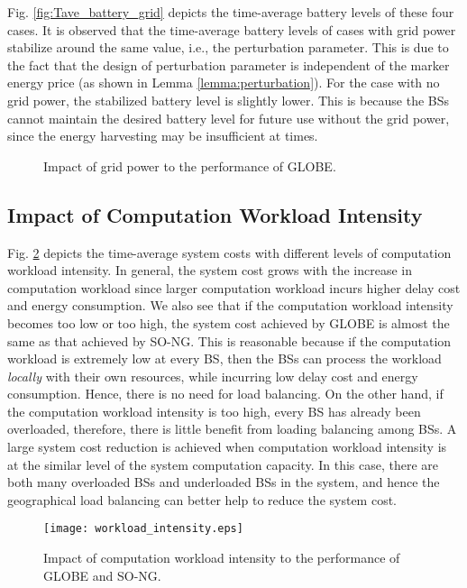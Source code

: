 \documentclass[12pt, draftclsnofoot, letterpaper, onecolumn]{IEEEtran}
\begin{document}
{Fig. \ref{fig:Tave_battery_grid} depicts the time-average battery levels of these four cases. It is observed that the time-average battery levels of cases with grid power stabilize around the same value, i.e., the perturbation parameter. This is due to the fact that the design of perturbation parameter is independent of the marker energy price (as shown in Lemma \ref{lemma:perturbation}). For the case with no grid power, the stabilized battery level is slightly lower. This is because the BSs cannot maintain the desired battery level for future use without the grid power, since the energy harvesting may be insufficient at times.

\begin{figure}[h]
	\centering	
	\caption{Impact of grid power to the performance of GLOBE.}
	\label{fig:grid_power}
\vspace{-20pt}
\end{figure}


\subsection{Impact of Computation Workload Intensity}
Fig. \ref{fig:workload_intensity} depicts the time-average system costs with different levels of computation workload intensity. In general, the system cost grows with the increase in computation workload since larger computation workload incurs higher delay cost and energy consumption. We also see that if the computation workload intensity becomes too low or too high, the system cost achieved by GLOBE is almost the same as that achieved by SO-NG. This is reasonable because if the computation workload is extremely low at every BS, then the BSs can process the workload \emph{locally} with their own resources, while incurring  low delay cost and energy consumption. Hence, there is no need for load balancing. On the other hand, if the computation workload intensity is too high, every BS has already been overloaded, therefore, there is little benefit from loading balancing among BSs. A large system cost reduction is achieved when computation workload intensity is at the similar level of the system computation capacity. In this case, there are both many overloaded BSs and underloaded BSs in the system, and hence the geographical load balancing can better help to reduce the system cost.
\begin{figure}[h]
	\centering	
	\texttt{[image: workload\_intensity.eps]}
\vspace{-10pt}
	\caption{Impact of computation workload intensity to the performance of GLOBE and SO-NG.}
	\label{fig:workload_intensity}
\vspace{-20pt}
\end{figure}

}
\end{document}
